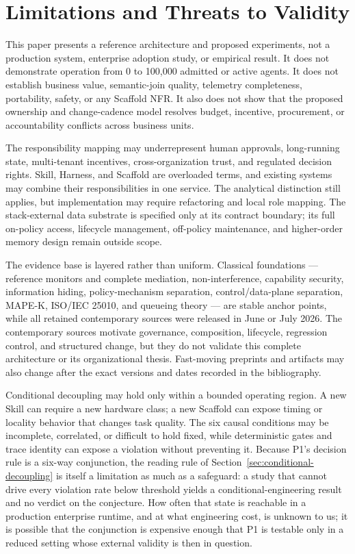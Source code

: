 \section{Limitations and Threats to Validity}
\label{sec:limitations}

This paper presents a reference architecture and proposed experiments, not a production system, enterprise adoption study, or empirical result. It does not demonstrate operation from 0 to 100{,}000 admitted or active agents. It does not establish business value, semantic-join quality, telemetry completeness, portability, safety, or any Scaffold NFR. It also does not show that the proposed ownership and change-cadence model resolves budget, incentive, procurement, or accountability conflicts across business units.

The responsibility mapping may underrepresent human approvals, long-running state, multi-tenant incentives, cross-organization trust, and regulated decision rights. Skill, Harness, and Scaffold are overloaded terms, and existing systems may combine their responsibilities in one service. The analytical distinction still applies, but implementation may require refactoring and local role mapping. The stack-external data substrate is specified only at its contract boundary; its full on-policy access, lifecycle management, off-policy maintenance, and higher-order memory design remain outside scope.

The evidence base is layered rather than uniform. Classical foundations --- reference monitors and complete mediation, non-interference, capability security, information hiding, policy-mechanism separation, control/data-plane separation, MAPE-K, ISO/IEC 25010, and queueing theory --- are stable anchor points, while all retained contemporary sources were released in June or July 2026. The contemporary sources motivate governance, composition, lifecycle, regression control, and structured change, but they do not validate this complete architecture or its organizational thesis. Fast-moving preprints and artifacts may also change after the exact versions and dates recorded in the bibliography.

Conditional decoupling may hold only within a bounded operating region. A new Skill can require a new hardware class; a new Scaffold can expose timing or locality behavior that changes task quality. The six causal conditions may be incomplete, correlated, or difficult to hold fixed, while deterministic gates and trace identity can expose a violation without preventing it. Because P1's decision rule is a six-way conjunction, the reading rule of Section~\ref{sec:conditional-decoupling} is itself a limitation as much as a safeguard: a study that cannot drive every violation rate below threshold yields a conditional-engineering result and no verdict on the conjecture. How often that state is reachable in a production enterprise runtime, and at what engineering cost, is unknown to us; it is possible that the conjunction is expensive enough that P1 is testable only in a reduced setting whose external validity is then in question.

